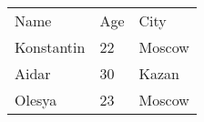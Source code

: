 \documentclass{article}
\begin{document}
\begin{tabular}{lll}
Name & Age & City \\
Konstantin & 22 & Moscow \\
Aidar & 30 & Kazan \\
Olesya & 23 & Moscow \\
\end{tabular}
\end{document}
